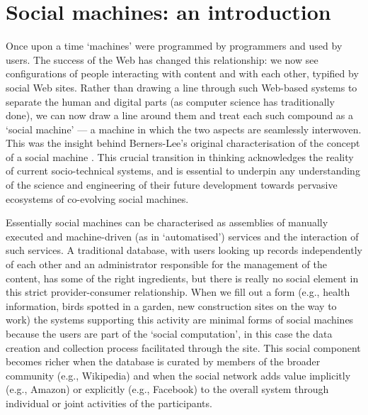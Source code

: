 \documentclass{sig-alternate}
\begin{document}



\section{Social machines: an introduction}
Once upon a time `machines' were programmed by programmers and used by users. The success of the Web has changed this relationship: we now see configurations of people interacting with content and with each other, typified by social Web sites. Rather than drawing a line through such Web-based systems to separate the human and digital parts (as computer science has traditionally done), we can now draw a line around them and treat each such compound as a `social machine' --- a machine in which the two aspects are seamlessly interwoven. This was the insight behind Berners-Lee's original characterisation of the concept of a social machine \cite{bernerslee1999}. This crucial transition in thinking acknowledges the reality of current socio-technical systems, and is essential to underpin any understanding of the science and engineering of their future development towards pervasive ecosystems of co-evolving social machines.

Essentially social machines can be characterised as assemblies of manually executed and machine-driven (as in `automatised') services and the interaction of such services. A traditional database, with users looking up records independently of each other and an administrator responsible for the management of the content, has some of the right ingredients, but there is really no social element in this strict provider-consumer relationship. When we fill out a form (e.g., health information, birds spotted in a garden, new construction sites on the way to work) the systems supporting this activity are minimal forms of social machines because the users are part of the `social computation', in this case the data creation and collection process facilitated through the site. This social component becomes richer when the database is curated by members of the broader community (e.g., Wikipedia) and when the social network adds value implicitly (e.g., Amazon) or explicitly (e.g., Facebook) to the overall system through individual or joint activities of the participants.
\end{document}
